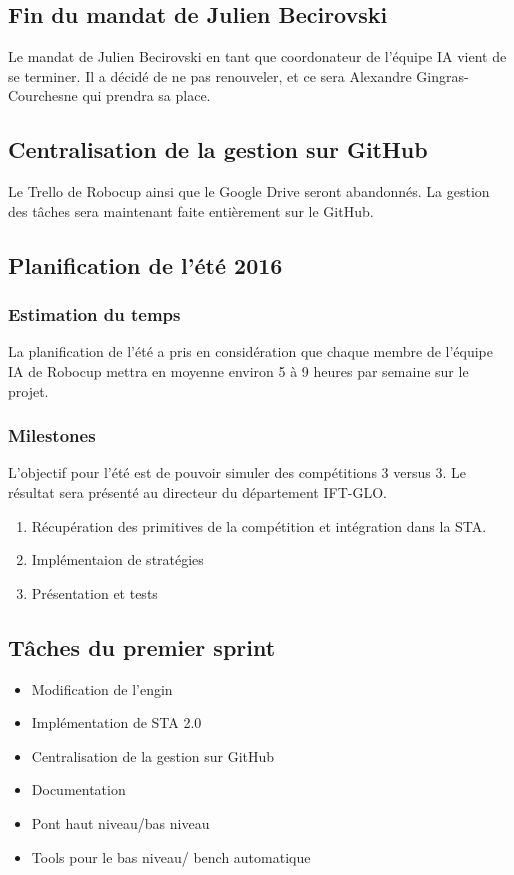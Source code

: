 \documentclass[12pt,letterpaper,twoside]{article}
\begin{document}
\subsection*{Fin du mandat de Julien Becirovski}
Le mandat de Julien Becirovski en tant que coordonateur de l'équipe IA vient de se terminer.
Il a décidé de ne pas renouveler, et ce sera Alexandre Gingras-Courchesne qui prendra sa place.

\subsection*{Centralisation de la gestion sur GitHub}
Le Trello de Robocup ainsi que le Google Drive seront abandonnés.
La gestion des t\^aches sera maintenant faite enti\`erement sur le GitHub. 

\subsection*{Planification de l'été 2016}

\subsubsection*{Estimation du temps}
La planification de l'été a pris en considération que chaque membre de l'équipe IA de Robocup mettra en moyenne environ 5 à 9 heures par semaine sur le projet.

\subsubsection*{Milestones}
L'objectif pour l'été est de pouvoir simuler des compétitions 3 versus 3.
Le résultat sera présenté au directeur du département IFT-GLO.

\begin{enumerate}
\item Récupération des primitives de la compétition et intégration dans la STA.
\item Implémentaion de stratégies
\item Présentation et tests
\end{enumerate}

\subsection*{T\^aches du premier sprint}

\begin{itemize}
\item Modification de l'engin
\item Implémentation de STA 2.0
\item Centralisation de la gestion sur GitHub
\item Documentation
\item Pont haut niveau/bas niveau
\item Tools pour le bas niveau/ bench automatique
\end{itemize}
\end{document}
